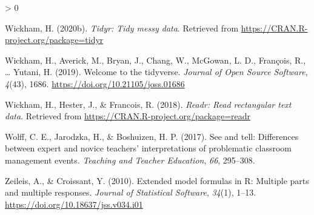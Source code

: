 \documentclass[
  english,
  man,floatsintext]{apa6}
\newlength{\cslhangindent}
\newenvironment{CSLReferences}[2] %
 {%
  \setlength{\parindent}{0pt}
  \ifodd #1 \everypar{\setlength{\hangindent}{\cslhangindent}}\ignorespaces\fi
  \ifnum #2 > 0
  \setlength{\parskip}{#2\baselineskip}
  \fi
 }%
 {}
\begin{document}
\begin{CSLReferences}{1}{0}
\leavevmode\hypertarget{ref-R-tidyr}{}%
Wickham, H. (2020b). \emph{Tidyr: Tidy messy data}. Retrieved from \url{https://CRAN.R-project.org/package=tidyr}

\leavevmode\hypertarget{ref-R-tidyverse}{}%
Wickham, H., Averick, M., Bryan, J., Chang, W., McGowan, L. D., François, R., \ldots{} Yutani, H. (2019). Welcome to the {tidyverse}. \emph{Journal of Open Source Software}, \emph{4}(43), 1686. \url{https://doi.org/10.21105/joss.01686}

\leavevmode\hypertarget{ref-R-readr}{}%
Wickham, H., Hester, J., \& Francois, R. (2018). \emph{Readr: Read rectangular text data}. Retrieved from \url{https://CRAN.R-project.org/package=readr}

\leavevmode\hypertarget{ref-wolff2017see}{}%
Wolff, C. E., Jarodzka, H., \& Boshuizen, H. P. (2017). See and tell: Differences between expert and novice teachers' interpretations of problematic classroom management events. \emph{Teaching and Teacher Education}, \emph{66}, 295--308.

\leavevmode\hypertarget{ref-R-Formula}{}%
Zeileis, A., \& Croissant, Y. (2010). Extended model formulas in {R}: Multiple parts and multiple responses. \emph{Journal of Statistical Software}, \emph{34}(1), 1--13. \url{https://doi.org/10.18637/jss.v034.i01}

\end{CSLReferences}

\endgroup
\end{document}
